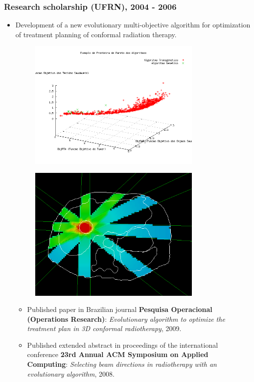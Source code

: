 \documentclass{beamer}
\begin{document}
\begin{frame}
	\frametitle{Research scholarship (UFRN), 2004 - 2006}
{
	
	  \begin{itemize}
	    \item<1-> Development of a new evolutionary multi-objective algorithm
	    for optimization of treatment planning of conformal radiation therapy.
		\begin{figure}[ht]
			\begin{minipage}[b]{0.45\linewidth}
				\centering
				\includegraphics[width=0.80\textwidth]{images/front.png}
				\label{fig:pareto}				
			\end{minipage}
			\hspace{0.5cm}
			\begin{minipage}[b]{0.45\linewidth}
				\centering
				\includegraphics[width=0.80\textwidth]{images/trans1.PNG}
				\label{fig:transsolution}				
			\end{minipage}
		\end{figure}
		\begin{itemize}
			\item<2-> Published paper in Brazilian journal \textbf{Pesquisa
			Operacional (Operations Research)}: \textit{Evolutionary algorithm to
			optimize the treatment plan in 3D conformal radiotherapy}, 2009.
			\item<3-> Published extended abstract in proceedings of the international
			conference \textbf{23rd Annual ACM Symposium on Applied Computing}:
			\textit{Selecting beam directions in radiotherapy with an evolutionary algorithm}, 2008.  
		\end{itemize}
		

\end{itemize}}
\end{frame}
\end{document}
